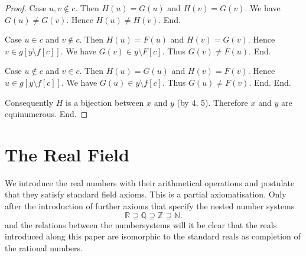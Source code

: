 \documentclass{article}
\begin{document}
\begin{forthel}
\begin{proof}
          Case $u,v \notin c$.
            Then $H(u) = G(u)$ and $H(v) = G(v)$.
            We have $G(u) \neq G(v)$.
            Hence $H(u) \neq H(v)$.
          End.

          Case $u \in c$ and $v \notin c$.
            Then $H(u) = F(u)$ and $H(v) = G(v)$.
            Hence $v \in g[y \setminus f[c]]$.
            We have $G(v) \in y \setminus F[c]$.
            Thus $G(v) \neq F(u)$.
          End.

          Case $u \notin c$ and $v \in c$.
            Then $H(u) = G(u)$ and $H(v) = F(v)$.
            Hence $u \in g[y \setminus f[c]]$.
            We have $G(u) \in y \setminus f[c]$.
            Thus $G(u) \neq F(v)$.
          End.
        End.

        Consequently $H$ is a bijection between $x$ and $y$ (by 4, 5).
        Therefore $x$ and $y$ are equinumerous.
      End.
    \end{proof}
  \end{forthel}

\section{The Real Field}

We introduce the real numbers with their  
arithmetical operations and postulate that
they satisfy standard field axioms. This is a partial
axiomatisation.
Only after the introduction
of further axioms that specify the nested number systems
\[ \mathbb{R} \supseteq \mathbb{Q} \supseteq \mathbb{Z}
\supseteq \mathbb{N}. \]
and the relations between the numbersystems will it be clear 
that the reals introduced along this paper are isomorphic to
the standard reals as completion of the rational numbers.
\end{document}

